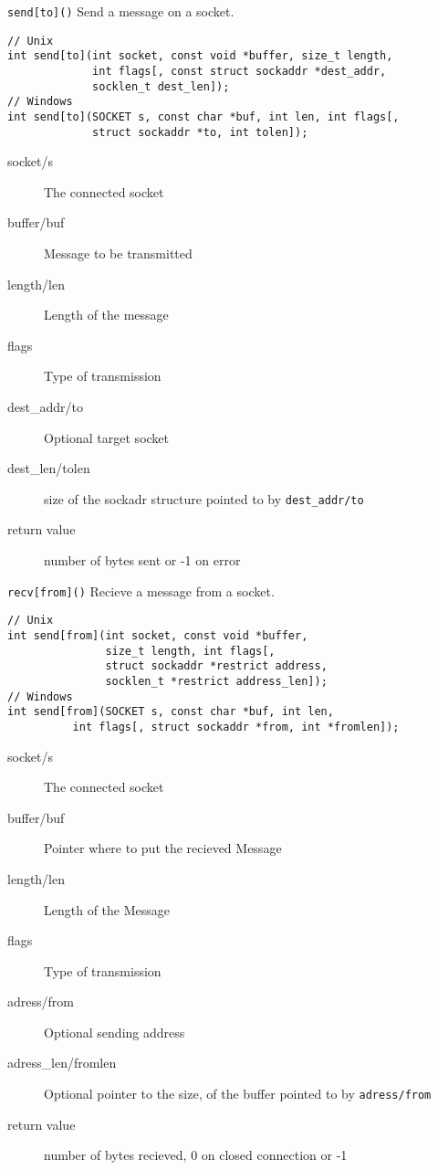 \begin{frame}[fragile]{\texttt{send[to]()}}
    Send a message on a socket.
    \begin{lstlisting}[numbers=none,morekeywords={*,SOCKET,sockaddr,socklen_t}]
// Unix
int send[to](int socket, const void *buffer, size_t length,
		 	 int flags[, const struct sockaddr *dest_addr,
    	 	 socklen_t dest_len]);
// Windows
int send[to](SOCKET s, const char *buf, int len, int flags[,
		     struct sockaddr *to, int tolen]);
\end{lstlisting}
    \begin{description}
        \item[socket/s] The connected socket
        \item[buffer/buf] Message to be transmitted
        \item[length/len] Length of the message
        \item[flags] Type of transmission
        \item[dest\_addr/to] Optional target socket
        \item[dest\_len/tolen] size of the sockadr structure pointed to by \texttt{dest\_addr/to}
        \item[return value] number of bytes sent or -1 on error
    \end{description}
\end{frame}

\begin{frame}[fragile]{\texttt{recv[from]()}}
    Recieve a message from a socket.
    \begin{lstlisting}[numbers=none,morekeywords={*,SOCKET,sockaddr,socklen_t}]
// Unix
int send[from](int socket, const void *buffer,
	   		   size_t length, int flags[,
			   struct sockaddr *restrict address,
		 	   socklen_t *restrict address_len]);
// Windows
int send[from](SOCKET s, const char *buf, int len,
		  int flags[, struct sockaddr *from, int *fromlen]);
\end{lstlisting}
    \begin{description}
        \item[socket/s] The connected socket
        \item[buffer/buf] Pointer where to put the recieved Message
        \item[length/len] Length of the Message
        \item[flags] Type of transmission
        \item[adress/from] Optional sending address
        \item[adress\_len/fromlen] Optional pointer to the size, of the buffer pointed to by \texttt{adress/from}
        \item[return value] number of bytes recieved, 0 on closed connection or -1
    \end{description}
    \bigskip
    
\end{frame}


